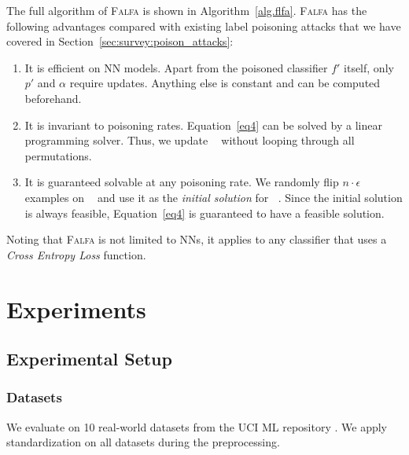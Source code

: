 \documentclass[runningheads]{llncs}
\newcommand{\falfa}{\textsc{Falfa}\xspace}
\DeclareMathOperator*{\ytr}{\mathcal{Y}_\text{train}}
\DeclareMathOperator*{\ypo}{\mathcal{Y}^\prime_\text{train}}
\begin{document}
The full algorithm of \falfa is shown in Algorithm~\ref{alg.flfa}.
\falfa has the following advantages compared with existing label poisoning attacks that we have covered in Section~\ref{sec:survey:poison_attacks}:
\begin{enumerate}
    \item It is efficient on NN models. Apart from the poisoned classifier $f'$ itself, only $p'$ and $\alpha$ require updates. Anything else is constant and can be computed beforehand.
    \item It is invariant to poisoning rates. Equation~\ref{eq4} can be solved by a linear programming solver. Thus, we update $\ypo$ without looping through all permutations.
    \item It is guaranteed solvable at any poisoning rate. We randomly flip $n \cdot \epsilon$ examples on $\ytr$ and use it as the {\em initial solution} for $\ypo$. Since the initial solution is always feasible, Equation~\ref{eq4} is guaranteed to have a feasible solution.
\end{enumerate}
Noting that \falfa is not limited to NNs, it applies to any classifier that uses a \emph{Cross Entropy Loss} function.

\section{Experiments}
\label{sec:exp}

\subsection{Experimental Setup}

\subsubsection{Datasets}
We evaluate \diva on 10 real-world datasets from the UCI ML repository \cite{Dua2019}.
We apply standardization on all datasets during the preprocessing.
\end{document}
